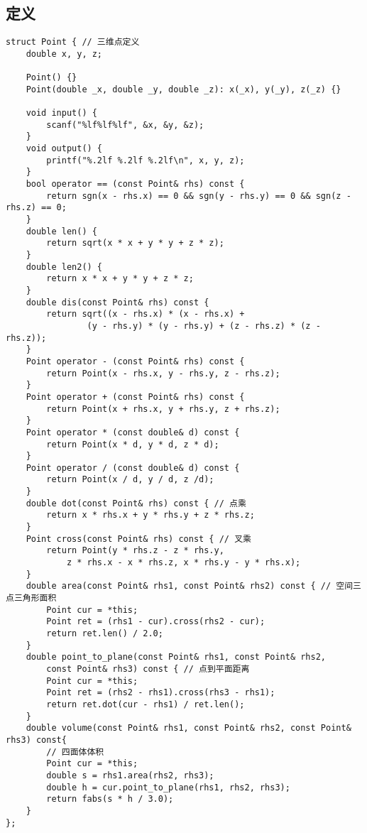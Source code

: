 \subsection{定义}
\begin{lstlisting}
struct Point { // 三维点定义
	double x, y, z;

	Point() {}
	Point(double _x, double _y, double _z): x(_x), y(_y), z(_z) {}

	void input() {
		scanf("%lf%lf%lf", &x, &y, &z);
	}
	void output() {
		printf("%.2lf %.2lf %.2lf\n", x, y, z);
	}
	bool operator == (const Point& rhs) const {
		return sgn(x - rhs.x) == 0 && sgn(y - rhs.y) == 0 && sgn(z - rhs.z) == 0;
	}
	double len() {
		return sqrt(x * x + y * y + z * z);
	}
	double len2() {
		return x * x + y * y + z * z;
	}
	double dis(const Point& rhs) const {
		return sqrt((x - rhs.x) * (x - rhs.x) +
				(y - rhs.y) * (y - rhs.y) + (z - rhs.z) * (z - rhs.z));
	}
	Point operator - (const Point& rhs) const {
		return Point(x - rhs.x, y - rhs.y, z - rhs.z);
	}
	Point operator + (const Point& rhs) const {
		return Point(x + rhs.x, y + rhs.y, z + rhs.z);
	}
	Point operator * (const double& d) const {
		return Point(x * d, y * d, z * d);
	}
	Point operator / (const double& d) const {
		return Point(x / d, y / d, z /d);
	}
	double dot(const Point& rhs) const { // 点乘
		return x * rhs.x + y * rhs.y + z * rhs.z;
	}
	Point cross(const Point& rhs) const { // 叉乘
		return Point(y * rhs.z - z * rhs.y,
			z * rhs.x - x * rhs.z, x * rhs.y - y * rhs.x);
	}
	double area(const Point& rhs1, const Point& rhs2) const { // 空间三点三角形面积
		Point cur = *this;
		Point ret = (rhs1 - cur).cross(rhs2 - cur);
		return ret.len() / 2.0;
	}
	double point_to_plane(const Point& rhs1, const Point& rhs2,
        const Point& rhs3) const { // 点到平面距离
		Point cur = *this;
		Point ret = (rhs2 - rhs1).cross(rhs3 - rhs1);
		return ret.dot(cur - rhs1) / ret.len();
	}
	double volume(const Point& rhs1, const Point& rhs2, const Point& rhs3) const{
        // 四面体体积
		Point cur = *this;
		double s = rhs1.area(rhs2, rhs3);
		double h = cur.point_to_plane(rhs1, rhs2, rhs3);
		return fabs(s * h / 3.0);
	}
};
\end{lstlisting}

